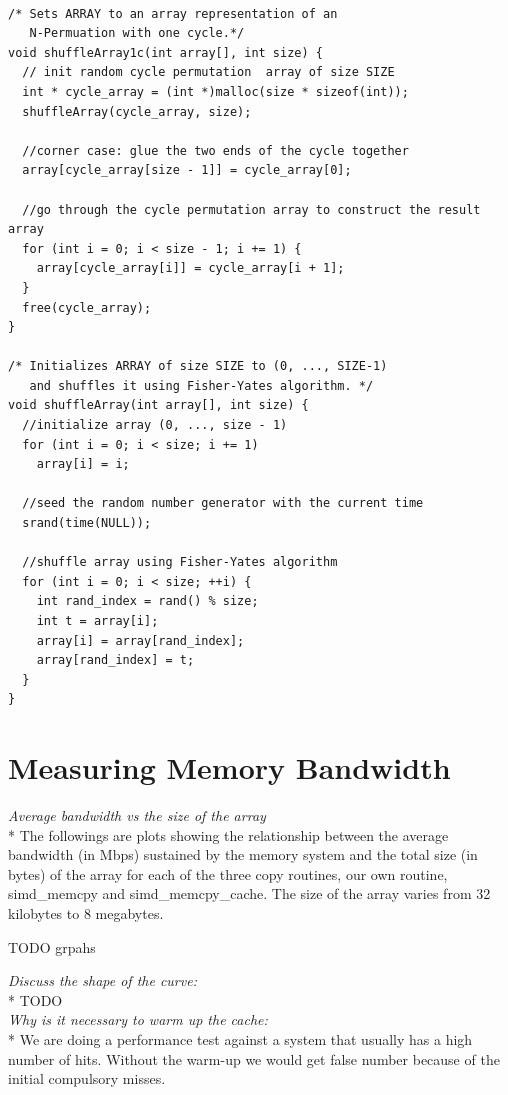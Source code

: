 \documentclass[11pt,letter]{article}
\begin{document}
\begin{lstlisting}[label=some-code,caption=Random Permutation with 1 cycle]

/* Sets ARRAY to an array representation of an                                  
   N-Permuation with one cycle.*/
void shuffleArray1c(int array[], int size) {
  // init random cycle permutation  array of size SIZE
  int * cycle_array = (int *)malloc(size * sizeof(int));
  shuffleArray(cycle_array, size);
  
  //corner case: glue the two ends of the cycle together
  array[cycle_array[size - 1]] = cycle_array[0];

  //go through the cycle permutation array to construct the result array
  for (int i = 0; i < size - 1; i += 1) {
    array[cycle_array[i]] = cycle_array[i + 1];
  }
  free(cycle_array);
}

/* Initializes ARRAY of size SIZE to (0, ..., SIZE-1)   
   and shuffles it using Fisher-Yates algorithm. */
void shuffleArray(int array[], int size) {
  //initialize array (0, ..., size - 1)
  for (int i = 0; i < size; i += 1)
    array[i] = i;

  //seed the random number generator with the current time
  srand(time(NULL));

  //shuffle array using Fisher-Yates algorithm
  for (int i = 0; i < size; ++i) {
    int rand_index = rand() % size;
    int t = array[i];
    array[i] = array[rand_index];
    array[rand_index] = t;
  }
}
\end{lstlisting}


\section{Measuring Memory Bandwidth}

\noindent\emph{Average bandwidth vs the size of the array}\\*
The followings are plots showing the relationship between the average bandwidth (in Mbps) sustained by the memory system and the total size (in bytes) of the array for each of the three copy routines, our own routine, simd\_memcpy and simd\_memcpy\_cache. The size of the array varies  from 32 kilobytes to 8 megabytes. 

TODO grpahs

\noindent\emph{Discuss the shape of the curve:}\\*
TODO\\[10pt]

\noindent\emph{Why is it necessary to warm up the cache:}\\*
We are doing a performance test against a system that usually has  a high number of hits. Without the warm-up we would get false number because of the initial compulsory misses.\\[10pt]
\end{document}
